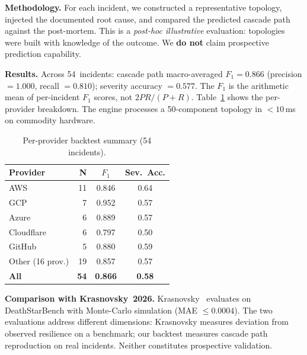 \documentclass[conference,10pt]{IEEEtran}
\begin{document}
\textbf{Methodology.} For each incident, we constructed a
representative topology, injected the documented root cause, and
compared the predicted cascade path against the post-mortem.
This is a \emph{post-hoc illustrative} evaluation: topologies were
built with knowledge of the outcome. We \textbf{do not} claim
prospective prediction capability.

\textbf{Results.} Across 54~incidents: cascade path
macro-averaged $F_1 = 0.866$ (precision $= 1.000$, recall $= 0.810$);
severity accuracy $= 0.577$. The $F_1$ is the arithmetic mean of
per-incident $F_1$ scores, not $2PR/(P{+}R)$.
Table~\ref{tab:provider} shows the per-provider breakdown.
The engine processes a 50-component topology in ${<}10$\,ms on
commodity hardware.

\begin{table}[t]
\centering
\caption{Per-provider backtest summary (54 incidents).}
\label{tab:provider}
\footnotesize
\begin{tabular}{@{}lrcc@{}}
\toprule
\textbf{Provider} & \textbf{N} & \textbf{$F_1$} & \textbf{Sev.\ Acc.} \\
\midrule
AWS               & 11 & 0.846 & 0.64 \\
GCP               &  7 & 0.952 & 0.57 \\
Azure             &  6 & 0.889 & 0.57 \\
Cloudflare        &  6 & 0.797 & 0.50 \\
GitHub            &  5 & 0.880 & 0.59 \\
Other (16 prov.)  & 19 & 0.857 & 0.57 \\
\midrule
\textbf{All}      & \textbf{54} & \textbf{0.866} & \textbf{0.58} \\
\bottomrule
\end{tabular}
\end{table}

\textbf{Comparison with Krasnovsky~2026.}
Krasnovsky~\cite{krasnovsky2026} evaluates on DeathStarBench with
Monte-Carlo simulation (MAE $\le 0.0004$). The two evaluations
address different dimensions: Krasnovsky measures deviation from
observed resilience on a benchmark; our backtest measures cascade
path reproduction on real incidents. Neither constitutes prospective
validation.
\end{document}
